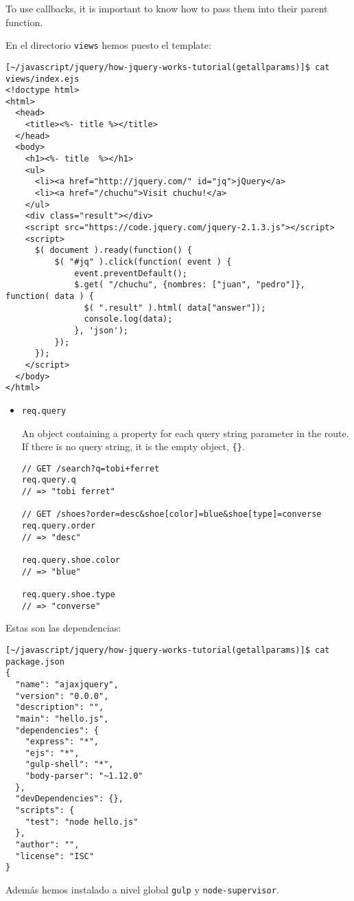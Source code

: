 To use callbacks, it is important to know how to pass them into their parent function.

En el directorio \verb|views| hemos puesto el template:
\begin{verbatim}
[~/javascript/jquery/how-jquery-works-tutorial(getallparams)]$ cat views/index.ejs 
<!doctype html>
<html>
  <head>
    <title><%- title %></title>
  </head>
  <body>
    <h1><%- title  %></h1>
    <ul>
      <li><a href="http://jquery.com/" id="jq">jQuery</a>
      <li><a href="/chuchu">Visit chuchu!</a>
    </ul>
    <div class="result"></div>
    <script src="https://code.jquery.com/jquery-2.1.3.js"></script>
    <script>
      $( document ).ready(function() {
          $( "#jq" ).click(function( event ) {
              event.preventDefault();
              $.get( "/chuchu", {nombres: ["juan", "pedro"]}, function( data ) {
                $( ".result" ).html( data["answer"]);
                console.log(data);
              }, 'json');
          });
      });
    </script>
  </body>
</html>
\end{verbatim}
\begin{itemize}
\item
\verb|req.query|

An object containing a property for each query string parameter in the route. If there is no query string, it is the empty object, \verb|{}|.

\begin{verbatim}
// GET /search?q=tobi+ferret
req.query.q
// => "tobi ferret"

// GET /shoes?order=desc&shoe[color]=blue&shoe[type]=converse
req.query.order
// => "desc"

req.query.shoe.color
// => "blue"

req.query.shoe.type
// => "converse"
\end{verbatim}
\end{itemize}

Estas son las dependencias:
\begin{verbatim}
[~/javascript/jquery/how-jquery-works-tutorial(getallparams)]$ cat package.json 
{
  "name": "ajaxjquery",
  "version": "0.0.0",
  "description": "",
  "main": "hello.js",
  "dependencies": {
    "express": "*",
    "ejs": "*",
    "gulp-shell": "*",
    "body-parser": "~1.12.0"
  },
  "devDependencies": {},
  "scripts": {
    "test": "node hello.js"
  },
  "author": "",
  "license": "ISC"
}
\end{verbatim}
Además hemos instalado a nivel global \verb|gulp| y \verb|node-supervisor|.

